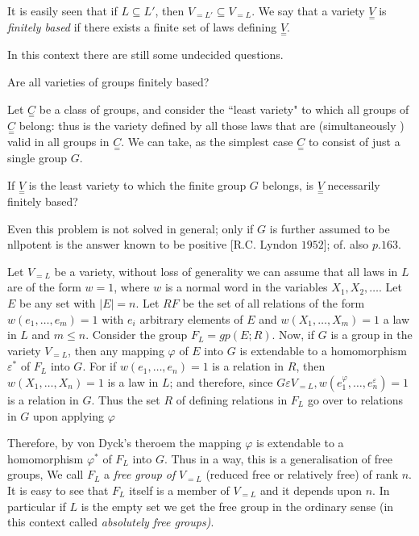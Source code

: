 It is easily seen that if $L \subseteq L'$, then $V_{=L'} \subseteq
V_{=L}$. We say that a variety $\underset{=}V$ is \textit{finitely
  based} if there exists a finite set of laws defining
$\underset{=}V$.  

In this context there are still some undecided questions. 

\begin{problem}
  Are all varieties of groups finitely based?
\end{problem}
 
Let $\underset{=}C$ be a class of groups, and consider the ``least
variety" to which all groups of  $\underset{=}C$ belong: thus is the
variety defined by all those laws that are (simultaneously ) valid in
all groups in $\underset{=}C$. We can take, as the simplest case
$\underset{=}C$ to consist of just a single group $G$. 

\begin{problem}
  If $\underset{=}V$ is the least variety to which the finite group
  $G$ belongs, is $\underset{=}V$ necessarily finitely based?   
\end{problem}
 
Even this problem is not solved in general; only if $G$ is further
assumed to be nllpotent is the answer known to be positive
[R.C. Lyndon $1952$]; of. also $p.163$. 

Let $V_{= L}$ be a variety, without loss of generality we can assume
that all laws in $L$ are of the form $w=1$, where $w$ is a normal word
in the variables $X_1,X_2,\ldots $. Let $E$ be any set with
$|E|=n$. Let $RF$ be the set of all relations of the form
$w(e_1,\ldots,e_m)=1$ with $e_i$ arbitrary elements of $E$ and $w(X_1,
\ldots, X_m)=1$ a law in $L$ and $m \leq n$. Consider the group $F_L =
gp(E;R)$. Now, if $G$ is a group in the variety $V_{=L}$, then any
mapping $\varphi$ of $E$ into $G$ is extendable to a homomorphism
$\varepsilon^*$ of $F_L$ into $G$. For if $w(e_1,\ldots,e_n)=1$ is a
relation in $R$, then $w(X_1,\ldots,X_n)=1$ is a law in $L$; and
therefore, since $G \varepsilon V_{=L}, w(e^\varphi_1,
\ldots,e^\varepsilon_n)=1$ is a relation in $G$. Thus the set $R$ of
defining relations in $F_L$ go over to relations in $G$ upon applying
$\varphi$ 

Therefore, by von Dyck's theroem the mapping $\varphi$ is extendable
to a homomorphism $\varphi^*$ of $F_L$ into $G$. Thus in a way, this
is a generalisation of free groups, We call $F_L$ a \textit{free group
  of} $V_{=L}$ (reduced free or relatively free) of rank $n$. It is
easy to see that $F_L$ itself is a member of $V_{=L}$ and it depends
upon $n$. In particular if $L$ is the empty set we get the free group
in the ordinary sense (in this context called \textit{absolutely free
  groups)}. 

